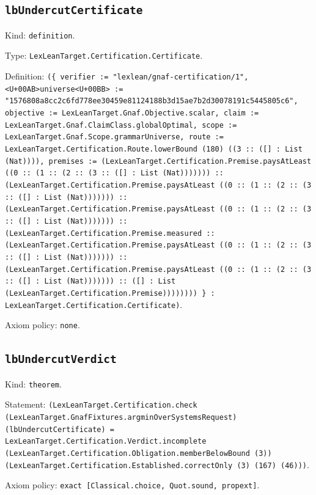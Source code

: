 \documentclass[11pt]{article}
\begin{document}
\subsection*{\texttt{lbUndercutCertificate}}
\noindent Kind: \texttt{definition}.\par
\noindent Type: \texttt{LexLeanTarget.Certification.Certificate}.\par
\noindent Definition: \texttt{(\{ verifier := "lexlean/gnaf-certification/1", <U+00AB>universe<U+00BB> := "1576808a8cc2c6fd778ee30459e81124188b3d15ae7b2d30078191c5445805c6", objective := LexLeanTarget.Gnaf.Objective.scalar, claim := LexLeanTarget.Gnaf.ClaimClass.globalOptimal, scope := LexLeanTarget.Gnaf.Scope.grammarUniverse, route := LexLeanTarget.Certification.Route.lowerBound (180) ((3 :: ([] : List (Nat)))), premises := (LexLeanTarget.Certification.Premise.paysAtLeast ((0 :: (1 :: (2 :: (3 :: ([] : List (Nat))))))) :: (LexLeanTarget.Certification.Premise.paysAtLeast ((0 :: (1 :: (2 :: (3 :: ([] : List (Nat))))))) :: (LexLeanTarget.Certification.Premise.paysAtLeast ((0 :: (1 :: (2 :: (3 :: ([] : List (Nat))))))) :: (LexLeanTarget.Certification.Premise.measured :: (LexLeanTarget.Certification.Premise.paysAtLeast ((0 :: (1 :: (2 :: (3 :: ([] : List (Nat))))))) :: (LexLeanTarget.Certification.Premise.paysAtLeast ((0 :: (1 :: (2 :: (3 :: ([] : List (Nat))))))) :: ([] : List (LexLeanTarget.Certification.Premise)))))))) \} : LexLeanTarget.Certification.Certificate)}.\par
\noindent Axiom policy: \texttt{none}.\par
\subsection*{\texttt{lbUndercutVerdict}}
\noindent Kind: \texttt{theorem}.\par
\noindent Statement: \texttt{(LexLeanTarget.Certification.check (LexLeanTarget.GnafFixtures.argminOverSystemsRequest) (lbUndercutCertificate) = LexLeanTarget.Certification.Verdict.incomplete (LexLeanTarget.Certification.Obligation.memberBelowBound (3)) (LexLeanTarget.Certification.Established.correctOnly (3) (167) (46)))}.\par
\noindent Axiom policy: \texttt{exact [Classical.choice, Quot.sound, propext]}.\par
\end{document}
